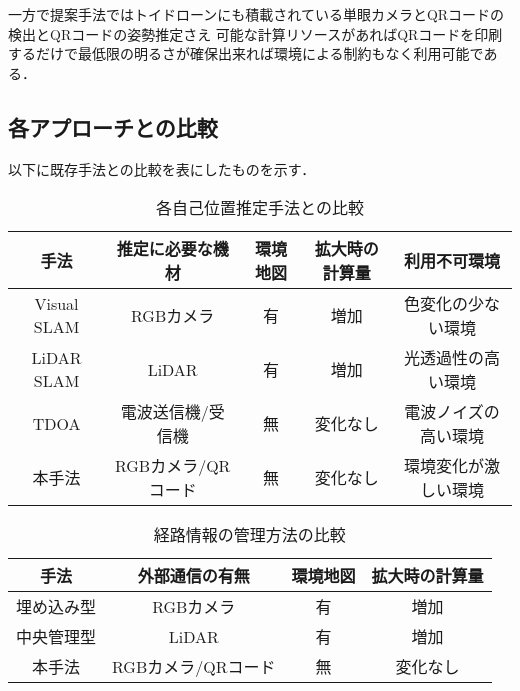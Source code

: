 一方で提案手法ではトイドローンにも積載されている単眼カメラとQRコードの検出とQRコードの姿勢推定さえ
可能な計算リソースがあればQRコードを印刷するだけで最低限の明るさが確保出来れば環境による制約もなく利用可能である．

\subsection{各アプローチとの比較}
以下に既存手法との比較を表にしたものを示す．

\begin{table}[h]
    \caption{各自己位置推定手法との比較}
    \label{table:compare_localization}
    \centering
    \begin{tabular}{ccccc}
        \hline
        手法 & 推定に必要な機材 & 環境地図 & 拡大時の計算量 & 利用不可環境 \\
        \hline \hline
        Visual SLAM & RGBカメラ & 有 & 増加 & 色変化の少ない環境\\
        LiDAR SLAM & LiDAR & 有 & 増加 & 光透過性の高い環境\\
        TDOA & 電波送信機/受信機 & 無 & 変化なし & 電波ノイズの高い環境\\
        本手法 & RGBカメラ/QRコード & 無 & 変化なし & 環境変化が激しい環境\\
        \hline
    \end{tabular}
\end{table}

\begin{table}[h]
    \caption{経路情報の管理方法の比較}
    \label{table:compare_route_info}
    \centering
    \begin{tabular}{cccc}
        \hline
        手法 & 外部通信の有無 & 環境地図 & 拡大時の計算量 \\
        \hline \hline
        埋め込み型 & RGBカメラ & 有 & 増加 \\
        中央管理型 & LiDAR & 有 & 増加 \\
        本手法 & RGBカメラ/QRコード & 無 & 変化なし \\
        \hline
    \end{tabular}
\end{table}
